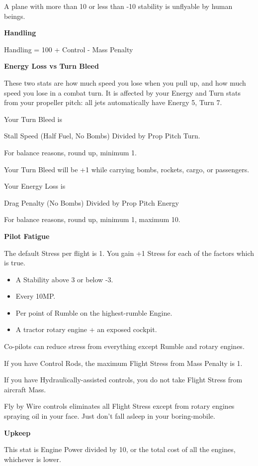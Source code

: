 \documentclass{article}
\begin{document}
A plane with more than 10 or less than -10 stability is unflyable
by human beings.

\textbf{Handling}

Handling = 100 + Control - Mass Penalty

\textbf{Energy Loss vs Turn Bleed}

These two stats are how much speed you lose when you pull up, and
how much speed you lose in a combat turn. It is affected by your Energy
and Turn stats from your propeller pitch: all jets automatically have
Energy 5, Turn 7.

Your Turn Bleed is

Stall Speed (Half Fuel, No Bombs) Divided by Prop Pitch Turn.

For balance reasons, round up, minimum 1.

Your Turn Bleed will be +1 while carrying bombs, rockets, cargo,
or passengers.

Your Energy Loss is

Drag Penalty (No Bombs) Divided by Prop Pitch Energy

For balance reasons, round up, minimum 1, maximum 10.

\textbf{Pilot Fatigue}

The default Stress per flight is 1. You gain +1 Stress for each
of the factors which is true.

\begin{itemize}
  \item A Stability above 3 or below -3.
  \item Every 10MP.
  \item Per point of Rumble on the highest-rumble Engine.
  \item A tractor rotary engine + an exposed cockpit.
\end{itemize}

Co-pilots can reduce stress from everything except Rumble and
rotary engines.

If you have Control Rods, the maximum Flight Stress from Mass
Penalty is 1.

If you have Hydraulically-assisted controls, you do not take
Flight Stress from aircraft Mass.

Fly by Wire controls eliminates all Flight Stress except from
rotary engines spraying oil in your face. Just don't fall asleep in your
boring-mobile.

\textbf{Upkeep}

This stat is Engine Power divided by 10, or the total cost of all
the engines, whichever is lower.
\end{document}
